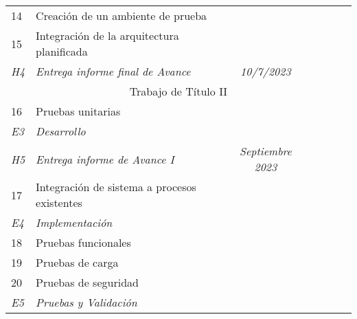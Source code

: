 \begin{table}[H]
{\begin{tabular}{@{}llllllll@{}}
			14                                                 & Creación de un ambiente de prueba                   &                                              &  &  &  &   & \\
			15                                                 & Integración de la arquitectura planificada          &                                              &  &  &  &   & \\
			\textit{H4}                                        & \textit{Entrega informe final de Avance}            & \multicolumn{2}{c}{\textit{10/7/2023}}       &  &  &  &     \\ \midrule
			\multicolumn{8}{c}{Trabajo de Título II}                                                                                                                               \\ \midrule
			16                                                 & Pruebas unitarias                                   &                                              &  &  &  &   & \\
			\textit{E3}                                        & \textit{Desarrollo}                                 &                                              &  &  &  &   & \\
			\textit{H5}                                        & \textit{Entrega informe de Avance I}                & \multicolumn{2}{c}{\textit{Septiembre 2023}} &  &  &  &     \\
			17                                                 & Integración de sistema a procesos existentes        &                                              &  &  &  &   & \\
			\textit{E4}                                        & \textit{Implementación}                             &                                              &  &  &  &   & \\
			18                                                 & Pruebas funcionales                                 &                                              &  &  &  &   & \\
			19                                                 & Pruebas de carga                                    &                                              &  &  &  &   & \\
			20                                                 & Pruebas de seguridad                                &                                              &  &  &  &   & \\
			\textit{E5}                                        & \textit{Pruebas y Validación}                       &                                              &  &  &  &   & \\

\end{tabular}}
\end{table}
